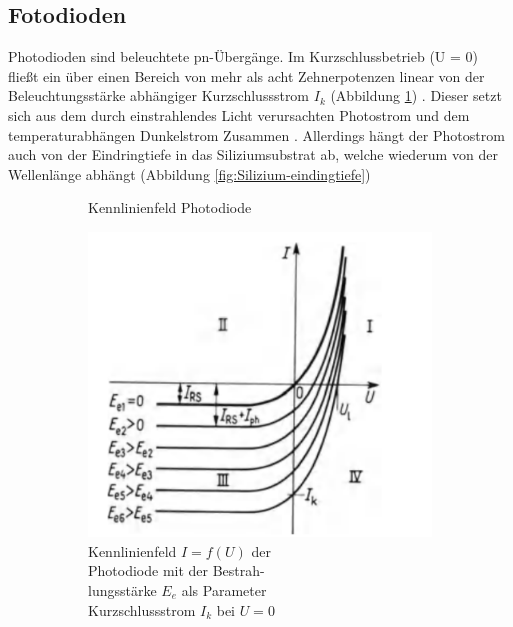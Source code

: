 
\subsection{Fotodioden}
Photodioden sind beleuchtete pn-Übergänge. Im Kurzschlussbetrieb (U = 0) fließt ein über einen Bereich von mehr als acht Zehnerpotenzen linear von der Beleuchtungsstärke abhängiger Kurzschlussstrom $I_k$ (Abbildung \ref{fig:PhotodiodeKennline})
\cite{Aktive_Bauelemente}.
Dieser setzt sich aus dem durch einstrahlendes Licht verursachten Photostrom und dem temperaturabhängen Dunkelstrom Zusammen \cite{Halbleiterelektronik}.
Allerdings hängt der Photostrom auch von der Eindringtiefe in das Siliziumsubstrat ab, welche wiederum von der Wellenlänge abhängt (Abbildung  \ref{fig:Silizium-eindingtiefe}) \cite{osiopto_electronics}

\begin{figure}[H]
  \begin{subfigure}[b]{0.4\textwidth}
  \caption{Kennlinienfeld Photodiode}
    \includegraphics[width=\textwidth]{img/Photodiode-Kennline.png}
    \caption*{Kennlinienfeld $I=f(U)$ der \\Photodiode mit der Bestrah-\\lungsstärke $E_e$ als Parameter\\Kurzschlussstrom $I_k$ bei $U=0$}
    \label{fig:PhotodiodeKennline}
  \end{subfigure}
  \begin{subfigure}[b]{0.6\textwidth}

\end{subfigure}
\end{figure}
